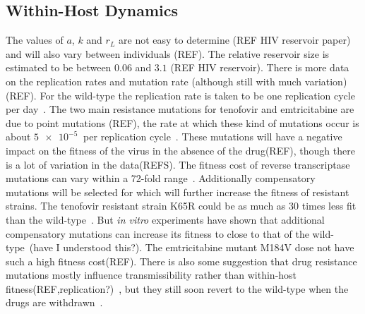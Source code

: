 \documentclass[DIV=15]{scrartcl}
\begin{document}
  
  \subsection{Within-Host Dynamics}
  



  The values of $a$, $k$ and $r_L$ are not easy to determine (REF HIV reservoir paper) and will also vary between individuals (REF). The relative reservoir size is estimated to be between $0.06$ and $3.1$ (REF HIV reservoir). There is more data on the replication rates and mutation rate (although still with much variation) (REF). For the wild-type the replication rate is taken to  be one replication cycle  per day~\cite{perelson1996}.  The two main resistance mutations for tenofovir and  emtricitabine are due to point mutations (REF), the rate at which these kind of mutations occur is about $\SI{5e-5}{}$ per replication cycle~\cite{gao2004,cuevas2015,abram2010}. These mutations will have a negative impact on the fitness of the virus in the absence of the drug(REF), though there is a lot of variation in the data(REFS). The fitness cost of reverse transcriptase mutations can vary within a 72-fold range~\cite{cong2007}. 
 Additionally compensatory mutations will  be selected for which will further increase the fitness of resistant strains. The tenofovir resistant strain K65R could be as much as $30$ times less fit than the wild-type~\cite{cong2007}. But \textit{in vitro} experiments have shown that additional compensatory mutations can increase its fitness to close to that of the wild-type~\cite{Svarovskaia2008}(have I understood this?). The emtricitabine mutant M184V
dose not have such a high fitness cost(REF). There is also some suggestion that drug resistance mutations mostly influence transmissibility rather than within-host fitness(REF,replication?)~\cite{drams}, but they still soon revert to the wild-type when the drugs are withdrawn~\cite{chateau2013}.

\end{document}
